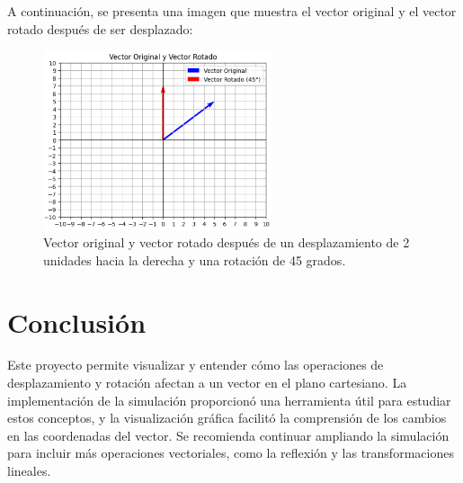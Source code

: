 \documentclass[a4paper, 10pt]{article}
\begin{document}
A continuación, se presenta una imagen que muestra el vector original y el vector rotado después de ser desplazado:

\begin{figure}[h!]
    \centering
    \includegraphics[width=0.6\textwidth]{resultado.png}
    \caption{Vector original y vector rotado después de un desplazamiento de 2 unidades hacia la derecha y una rotación de 45 grados.}
    \label{fig:resultados}
\end{figure}

\section{Conclusión}\label{s:5}
Este proyecto permite visualizar y entender cómo las operaciones de desplazamiento y rotación afectan a un vector en el plano cartesiano. La implementación de la simulación proporcionó una herramienta útil para estudiar estos conceptos, y la visualización gráfica facilitó la comprensión de los cambios en las coordenadas del vector. Se recomienda continuar ampliando la simulación para incluir más operaciones vectoriales, como la reflexión y las transformaciones lineales.
\end{document}
